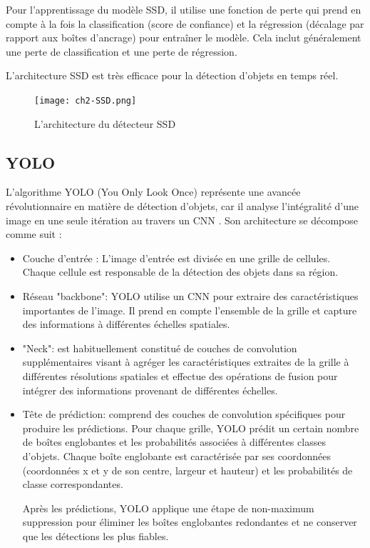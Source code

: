  
Pour l'apprentissage du modèle SSD, il utilise une fonction de perte qui prend en compte à la fois la classification (score de confiance) et la régression (décalage par rapport aux boîtes d'ancrage) pour entraîner le modèle. Cela inclut généralement une perte de classification et une perte de régression.
   
L'architecture SSD est très efficace pour la détection d'objets en temps réel. 

\begin{figure}[H]
	\centering
	\texttt{[image: ch2-SSD.png]}
	\caption{L'architecture du détecteur SSD}
    \label{SSD}
\end{figure}


\subsection{YOLO}
L'algorithme YOLO (You Only Look Once) représente une avancée révolutionnaire en matière de détection d'objets, car il analyse l'intégralité d'une image en une seule itération au travers un CNN \cite{redmon2016yolo}. Son architecture se décompose comme suit :
\begin{itemize}
    \item Couche d'entrée : L'image d'entrée est divisée en une grille de cellules. Chaque cellule est responsable de la détection des objets dans sa région.
    \item  Réseau "backbone": YOLO utilise un CNN pour extraire des caractéristiques importantes de l'image. Il prend en compte l'ensemble de la grille et capture des informations à différentes échelles spatiales.
    \item "Neck": est habituellement constitué de couches de convolution supplémentaires visant à 
    agréger les caractéristiques extraites de la grille à différentes résolutions spatiales et effectue des opérations de fusion pour intégrer des informations provenant de différentes échelles.
    \item Tête de prédiction: comprend des couches de convolution spécifiques pour produire les prédictions. Pour chaque grille, YOLO prédit un certain nombre de boîtes englobantes et les probabilités associées à différentes classes d'objets. Chaque boîte englobante est caractérisée par ses coordonnées (coordonnées x et y de son centre, largeur et hauteur) et les probabilités de classe correspondantes.
    
    Après les prédictions, YOLO applique une étape de non-maximum suppression pour éliminer les boîtes englobantes redondantes et ne conserver que les détections les plus fiables.
\end{itemize}

